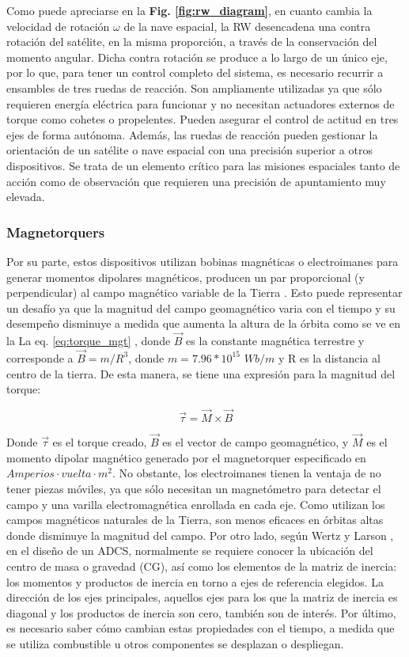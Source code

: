 Como puede apreciarse en la \textbf{Fig. \ref{fig:rw_diagram}}, en cuanto cambia la velocidad de rotación $\omega$ de la nave espacial, la RW desencadena una contra rotación del satélite, en la misma proporción, a través de la conservación del momento angular. Dicha contra rotación se produce a lo largo de un único eje, por lo que, para tener un control completo del sistema, es necesario recurrir a ensambles de tres ruedas de reacción.
Son ampliamente utilizadas ya que sólo requieren energía eléctrica para funcionar y no necesitan actuadores externos de torque como cohetes o propelentes. Pueden asegurar el control de actitud en tres ejes de forma autónoma. Además, las ruedas de reacción pueden gestionar la orientación de un satélite o nave espacial con una precisión superior a otros dispositivos. Se trata de un elemento crítico para las misiones espaciales tanto de acción como de observación que requieren una precisión de apuntamiento muy elevada.

\subsubsection{Magnetorquers}

Por su parte, estos dispositivos utilizan bobinas magnéticas o electroimanes para generar momentos dipolares magnéticos, producen un par proporcional (y perpendicular) al campo magnético variable de la Tierra \cite{Rycroft1997}. Esto puede representar un desafío ya que la magnitud del campo geomagnético varia con el tiempo y su desempeño disminuye a medida que aumenta la altura de la órbita como se ve en la La eq. \ref{eq:torque_mgt} , donde $\vec{B}$ es la constante magnética terrestre y corresponde a $ \vec{B}=m/R^3$, donde $m = 7.96*10^{15}$    $Wb/m$   y R es la distancia al centro de la tierra. De esta manera, se tiene una expresión para la magnitud del torque: 

\begin{equation}\label{eq:torque_mgt}
	\vec{\tau} = \vec{M}\times\vec{B}	
\end{equation}


Donde $\vec{\tau}$ es el torque creado, $\vec{B}$ es el vector de campo geomagnético, y $\vec{M}$ es el momento dipolar magnético generado por el magnetorquer especificado en $Amperios\cdot vuelta\cdot m^2$. No obstante, los electroimanes tienen la ventaja de no tener piezas móviles, ya que sólo necesitan un magnetómetro para detectar el campo y una varilla electromagnética enrollada en cada eje. Como utilizan los campos magnéticos naturales de la Tierra, son menos eficaces en órbitas altas donde disminuye la magnitud del campo.
Por otro lado, según Wertz y Larson \cite{Wertz1999} , en el diseño de un ADCS, normalmente se requiere conocer la ubicación del centro de masa o gravedad (CG), así como los elementos de la matriz de inercia: los momentos y productos de inercia en torno a ejes de referencia elegidos. La dirección de los ejes principales, aquellos ejes para los que la matriz de inercia es diagonal y los productos de inercia son cero, también son de interés. Por último, es necesario saber cómo cambian estas propiedades con el tiempo, a medida que se utiliza combustible u otros componentes se desplazan o despliegan.

